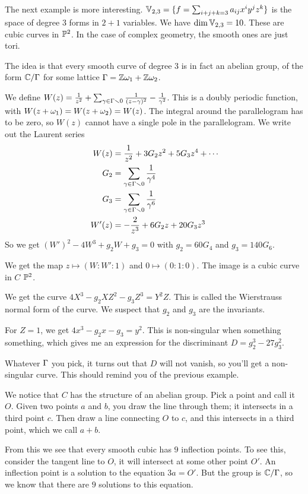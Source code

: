 The next example is more interesting. $\mathbb{V}_{2,3}=\{f=\sum_{i+j+k=3} a_{ij} x^iy^jz^k\}$ is the space of degree $3$ forms in $2+1$ variables. We have $\dim \mathbb{V}_{2,3}=10$. These are cubic curves in $\mathbb{P}^2$. In the case of complex geometry, the smooth ones are just tori.

The idea is that every smooth curve of degree 3 is in fact an abelian group, of the form $\mathbb{C}/\Gamma$ for some lattice $\Gamma=\mathbb{Z}\omega_1+\mathbb{Z}\omega_2$.

We define $W(z)=\frac{1}{z^2}+\sum_{\gamma\in \Gamma\smallsetminus 0} \frac{1}{(z-\gamma)^2}-\frac{1}{\gamma^2}$. This is a doubly periodic function, with $W(z+\omega_1)=W(z+\omega_2)=W(z)$. The integral around the parallelogram has to be zero, so $W(z)$ cannot have a single pole in the parallelogram. We write out the Laurent series
\begin{align*}
 W(z) &=\frac{1}{z^2}+3G_2z^2+5G_3z^4+\cdots\\
 G_2&=\sum_{\gamma\in \Gamma\smallsetminus 0} \frac{1}{\gamma^4}\\
 G_3&= \sum_{\gamma\in \Gamma\smallsetminus 0}\frac{1}{\gamma^6}\\
 W'(z) &= -\frac{2}{z^3}+6G_2z+20G_3z^3
\end{align*}
So we get $(W')^2-4W^3+g_2W+g_3=0$  with $g_2=60G_4$ and $g_3=140G_6$.

We get the map $z\mapsto (W:W':1)$ and $0\mapsto (0:1:0)$. The image is a cubic curve in $C$ $\mathbb{P}^2$.

We get the curve $4X^3-g_2XZ^2-g_3Z^3=Y^2Z$. This is called the Wierstrauss normal form of the curve. We suspect that $g_2$ and $g_3$ are the invariants.

For $Z=1$, we get $4x^3-g_2x-g_3=y^2$. This is non-singular when something something, which gives me an expression for the discriminant $D=g_2^3-27g_3^2$.

Whatever $\Gamma$ you pick, it turns out that $D$ will not vanish, so you'll get a non-singular curve. This should remind you of the previous example.

We notice that $C$ has the structure of an abelian group. Pick a point and call it $O$. Given two points $a$ and $b$, you draw the line through them; it intersects in a third point $c$. Then draw a line connecting $O$ to $c$, and this intersects in a third point, which we call $a+b$.

From this we see that every smooth cubic has $9$ inflection points. To see this, consider the tangent line to $O$, it will intersect at some other point $O'$. An inflection point is a solution to the equation $3a=O'$. But the group is $\mathbb{C}/\Gamma$, so we know that there are $9$ solutions to this equation.

